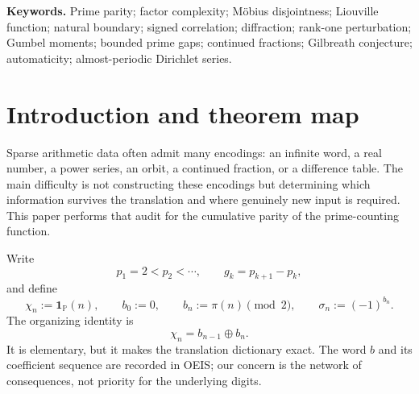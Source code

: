 \documentclass[11pt]{article}
\theoremstyle{definition}
\theoremstyle{remark}
\newcommand{\PP}{\mathbb P}
\newcommand{\one}{\mathbf 1}
\newcommand{\cP}{\mathfrak P}
\begin{document}
\begin{abstract}
For the dyadic numerators
\[
 N_n=\sum_{j=1}^n(-1)^{j+1}2^{p_n-p_j},
\]
one integer $N_n$ autonomously recovers the entire preceding prime history, and
$(N_n)$ is not $P$-recursive.  The three lacunary support series $F_Q,F_H,F_N$ are
hypertranscendental; their nonzero algebraic specializations are transcendental and their
rational specializations are Liouville numbers.  The Dirichlet series
$Z_N(s)=\sum N_n^{-s}$ has the imaginary axis as a natural boundary, and as
$s\downarrow0$ its full inverse-logarithmic expansion has coefficients
$(-1)^m\Gamma^{(m)}(1)$, the moments of the standard Gumbel law.  Hence its boundary
data recovers $\gamma$ and all positive-integer zeta cumulants.

Finally, the alternating prime-index Dirichlet series $P_{\rm alt}$ is the relative trace
of a critical rank-one perturbation that changes the inverse odd-prime spectrum into the
inverse even-prime spectrum.  Its Jessen functions give the vague zero-measure limit on
$\Re s>1/2$; the support has exact right edge
\[
 \sigma_{\mathrm e}=1.779544653546994\ldots,
 \qquad \cP(\sigma_{\mathrm e})=2^{1-\sigma_{\mathrm e}},
\]
and that boundary line is zero-free.  We close by isolating what remains open: in
particular $\sum_{n\le x}(-1)^{\pi(n)}=o(x)$ and Erd\H{o}s's alternating prime series
are not proved here.
\end{abstract}

\medskip
\noindent\textbf{Keywords.}
Prime parity; factor complexity; M\"obius disjointness; Liouville function; natural
boundary; signed correlation; diffraction; rank-one perturbation; Gumbel moments;
bounded prime gaps; continued fractions; Gilbreath conjecture; automaticity;
almost-periodic Dirichlet series.

\tableofcontents
\newpage
{}

\section{Introduction and theorem map}

Sparse arithmetic data often admit many encodings: an infinite word, a real number, a
power series, an orbit, a continued fraction, or a difference table.  The main difficulty
is not constructing these encodings but determining which information survives the
translation and where genuinely new input is required.  This paper performs that audit
for the cumulative parity of the prime-counting function.

Write
\[
 p_1=2<p_2<\cdots,\qquad g_k=p_{k+1}-p_k,
\]
and define
\begin{equation}\label{eq:basic-defs}
 \chi_n:=\one_{\PP}(n),\qquad b_0:=0,\qquad
 b_n:=\pi(n)\pmod 2,\qquad \sigma_n:=(-1)^{b_n}.
\end{equation}
The organizing identity is
\begin{equation}\label{eq:xor}
 \chi_n=b_{n-1}\oplus b_n.
\end{equation}
It is elementary, but it makes the translation dictionary exact.  The word $b$ and its
coefficient sequence are recorded in OEIS; our concern is the network of consequences,
not priority for the underlying digits.
\end{document}
